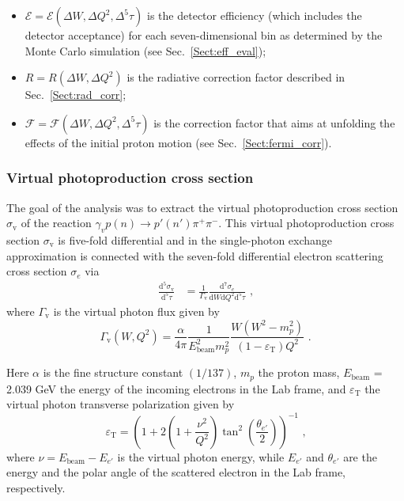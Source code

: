 \documentclass[prc,twocolumn,superscriptaddress,showpacs,amssymb,amsmath,amsfonts,aps,nofootinbib]{revtex4-1}
\begin{document}
\begin{itemize}
\item $\mathcal{E} = \mathcal{E}(\Delta W, \Delta Q^{2}, \Delta^{5}\tau)$ is the detector efficiency (which includes the detector acceptance) for each seven-dimensional bin as determined by the Monte Carlo simulation (see Sec.\!~\ref{Sect:eff_eval}); \vspace{-0.25em}

\item $R = R(\Delta W, \Delta Q^{2})$ is the radiative correction factor described in Sec.\!~\ref{Sect:rad_corr}; \vspace{-0.25em}

\item $\mathcal{F} = \mathcal{F}(\Delta W, \Delta Q^{2}, \Delta^{5}\tau)$ is the correction factor that aims at unfolding the effects of the initial proton motion (see Sec.\!~\ref{Sect:fermi_corr}).

\end{itemize}

\subsubsection{Virtual photoproduction cross section}


The goal of the analysis was to extract the virtual photoproduction cross section $\sigma_{\text{v}}$ of the reaction $\gamma_{v}p(n) \rightarrow p'(n') \pi^{+} \pi^{-}$. This virtual photoproduction cross section $\sigma_{\text{v}}$ is five-fold differential and in the single-photon exchange approximation is connected with the seven-fold differential electron scattering cross section $\sigma_{e}$ via 
\begin{equation}
\begin{aligned}
\frac{\textrm{d}^{5}\sigma_{\text{v}}}{\textrm{d}^{5}\tau} &= \frac{1}{\Gamma_{\text{v}}}\frac{\textrm{d}^{7}\sigma_{e}}{\textrm{d}W\textrm{d}Q^{2}\textrm{d}^{5}\tau}  \textrm{ ,}
\end{aligned} 
\label{fulldiff}
\end{equation}
where $\Gamma_{\text{v}}$ is the virtual photon flux given by
\begin{equation}
\Gamma_{\text{v}} (W, Q^2) =
\frac{\alpha}{4\pi}\frac{1}{E_{\text{beam}}^{2}m_{p}^{2}}\frac{W(W^{2}-m_{p}^{2})}
{(1-\varepsilon_{\text{T}})Q^{2}} \textrm{ .}
\label{flux}
\end{equation}

Here $\alpha$ is the fine structure constant $\left(1/137\right)$, $m_{p}$ the proton mass, $E_{\text{beam}}$ = 2.039 GeV the energy of the incoming electrons in the Lab frame, and $\varepsilon_{\text{T}}$ the virtual photon transverse polarization given by %
\begin{equation}
\varepsilon_{\text{T}} = \left( 1 + 2\left( 1 +
\frac{\nu^{2}}{Q^{2}} \right)
\tan^{2}\left(\frac{\theta_{e'}}{2}\right) \right)^{-1} \textrm{ ,}
\label{polarization}
\end{equation}
where $\nu = E_{\text{beam}} - E_{e'}$ is the virtual photon energy, while $E_{e'}$ and $\theta_{e'}$ are the energy and the polar angle of the scattered electron in the Lab frame, respectively. 
\end{document}
